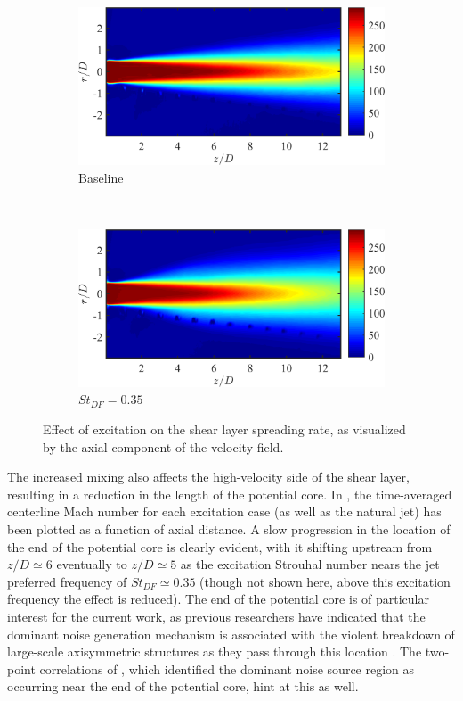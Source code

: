 \begin{figure}
	\centering
	\begin{subfigure}{0.75\textwidth}
		\centering
		\includegraphics[width=0.95\linewidth]{Figures/ch4_St000_Um.png}
		\caption{Baseline}
	\end{subfigure}\\
	\begin{subfigure}{0.75\textwidth}
		\centering
		\includegraphics[width=0.95\linewidth]{Figures/ch4_St035_Um.png}
		\caption{$St_{DF} = 0.35$}
	\end{subfigure}
	\caption{Effect of excitation on the shear layer spreading rate, as visualized by the axial component of the velocity field.}
	\label{fig:ch4_shearlayerspreading}
\end{figure}

The increased mixing also affects the high-velocity side of the shear layer, resulting in a reduction in the length of the potential core.
In , the time-averaged centerline Mach number for each excitation case (as well as the natural jet) has been plotted as a function of axial distance.
A slow progression in the location of the end of the potential core is clearly evident, with it shifting upstream from $z/D \simeq 6$ eventually to $z/D \simeq 5$ as the excitation Strouhal number nears the jet preferred frequency of $St_{DF} \simeq 0.35$ (though not shown here, above this excitation frequency the effect is reduced).
The end of the potential core is of particular interest for the current work, as previous researchers have indicated that the dominant noise generation mechanism is associated with the violent breakdown of large-scale axisymmetric structures as they pass through this location \citep{Hileman2005}.
The two-point correlations of , which identified the dominant noise source region as occurring near the end of the potential core, hint at this as well.


